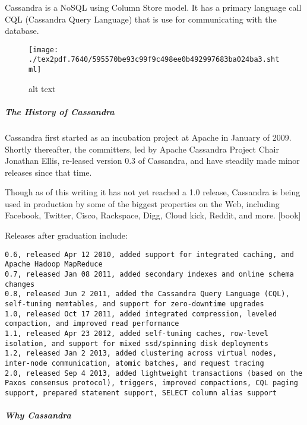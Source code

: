 \documentclass[]{article}
\let\oldsubparagraph\subparagraph
\renewcommand{\subparagraph}[1]{\oldsubparagraph{#1}\mbox{}}
\begin{document}
Cassandra is a NoSQL using Column Store model. It has a primary language
call CQL (Cassandra Query Language) that is use for communicating with
the database.

\begin{figure}
\centering
\texttt{[image: ./tex2pdf.7640/595570be93c99f9c498ee0b492997683ba024ba3.shtml]}
\caption{alt text}
\end{figure}

\hypertarget{the-history-of-cassandra}{%
\subparagraph{The History of Cassandra}\label{the-history-of-cassandra}}

Cassandra first started as an incubation project at Apache in January of
2009. Shortly thereafter, the committers, led by Apache Cassandra
Project Chair Jonathan Ellis, re-leased version 0.3 of Cassandra, and
have steadily made minor releases since that time.

Though as of this writing it has not yet reached a 1.0 release,
Cassandra is being used in production by some of the biggest properties
on the Web, including Facebook, Twitter, Cisco, Rackspace, Digg, Cloud
kick, Reddit, and more. {[}book{]}

Releases after graduation include:

\begin{verbatim}
0.6, released Apr 12 2010, added support for integrated caching, and Apache Hadoop MapReduce 
0.7, released Jan 08 2011, added secondary indexes and online schema changes 
0.8, released Jun 2 2011, added the Cassandra Query Language (CQL), self-tuning memtables, and support for zero-downtime upgrades 
1.0, released Oct 17 2011, added integrated compression, leveled compaction, and improved read performance 
1.1, released Apr 23 2012, added self-tuning caches, row-level isolation, and support for mixed ssd/spinning disk deployments 
1.2, released Jan 2 2013, added clustering across virtual nodes, inter-node communication, atomic batches, and request tracing 
2.0, released Sep 4 2013, added lightweight transactions (based on the Paxos consensus protocol), triggers, improved compactions, CQL paging support, prepared statement support, SELECT column alias support 
\end{verbatim}

\hypertarget{why-cassandra}{%
\subparagraph{Why Cassandra}\label{why-cassandra}}
\end{document}
